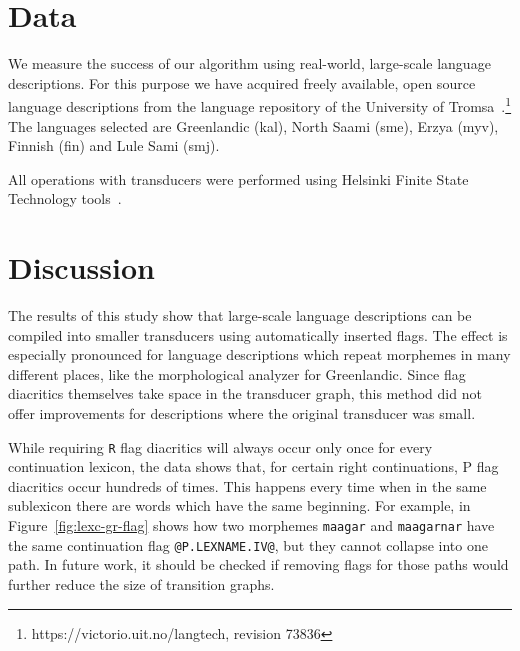 \documentclass[10pt, a4paper]{article}
\begin{document}

\section{Data}
\label{sec:data}

We measure the success of our algorithm using real-world, large-scale
language descriptions. For this purpose we have acquired freely
available, open source language descriptions from the language repository of the University of 
Tromsa~\cite{moshagen2013building}.\footnote{https://victorio.uit.no/langtech, revision 73836} The
languages selected are Greenlandic (kal), North Saami (sme), Erzya
(myv), Finnish (fin) and Lule Sami (smj).

All operations with transducers were performed using Helsinki Finite
State Technology tools~\cite{linden2011}.



\section{Discussion}
\label{sec:discussion}

The results of this study show that large-scale language descriptions
can be compiled into smaller transducers using automatically inserted
flags. The effect is especially pronounced for language descriptions
which repeat morphemes in many different places, like the
morphological analyzer for Greenlandic. Since flag diacritics
themselves take space in the transducer graph, this method did not
offer improvements for descriptions where the original
transducer was small.

While requiring {\tt R} flag diacritics will always occur only once
for every continuation lexicon, the data shows that, for
certain right continuations, P flag diacritics occur hundreds of
times. This happens every time when in the same sublexicon
there are words which have the same beginning. For example, in
Figure~\ref{fig:lexc-gr-flag} shows how two morphemes \texttt{maagar}
and \texttt{maagarnar} have the same continuation flag
\verb+@P.LEXNAME.IV@+, but they cannot collapse into one path. In future
work, it should be checked if removing flags for those paths would
further reduce the size of transition graphs.


\end{document}
